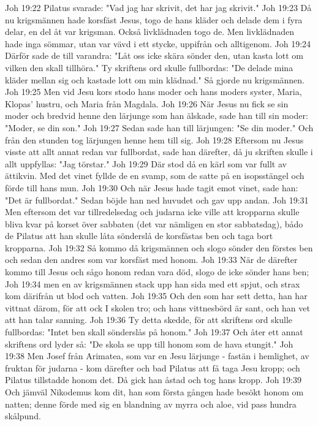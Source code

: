 Joh 19:22  Pilatus svarade: "Vad jag har skrivit, det har jag skrivit."
Joh 19:23  Då nu krigsmännen hade korsfäst Jesus, togo de hans kläder och delade dem i fyra delar, en del åt var krigsman. Också livklädnaden togo de. Men livklädnaden hade inga sömmar, utan var vävd i ett stycke, uppifrån och alltigenom.
Joh 19:24  Därför sade de till varandra: "Låt oss icke skära sönder den, utan kasta lott om vilken den skall tillhöra." Ty skriftens ord skulle fullbordas: "De delade mina kläder mellan sig och kastade lott om min klädnad." Så gjorde nu krigsmännen.
Joh 19:25  Men vid Jesu kors stodo hans moder och hans moders syster, Maria, Klopas' hustru, och Maria från Magdala.
Joh 19:26  När Jesus nu fick se sin moder och bredvid henne den lärjunge som han älskade, sade han till sin moder: "Moder, se din son."
Joh 19:27  Sedan sade han till lärjungen: "Se din moder." Och från den stunden tog lärjungen henne hem till sig.
Joh 19:28  Eftersom nu Jesus visste att allt annat redan var fullbordat, sade han därefter, då ju skriften skulle i allt uppfyllas: "Jag törstar."
Joh 19:29  Där stod då en kärl som var fullt av ättikvin. Med det vinet fyllde de en svamp, som de satte på en isopsstängel och förde till hans mun.
Joh 19:30  Och när Jesus hade tagit emot vinet, sade han: "Det är fullbordat." Sedan böjde han ned huvudet och gav upp andan.
Joh 19:31  Men eftersom det var tillredelsedag och judarna icke ville att kropparna skulle bliva kvar på korset över sabbaten (det var nämligen en stor sabbatsdag), bådo de Pilatus att han skulle låta sönderslå de korsfästas ben och taga bort kropparna.
Joh 19:32  Så kommo då krigsmännen och slogo sönder den förstes ben och sedan den andres som var korsfäst med honom.
Joh 19:33  När de därefter kommo till Jesus och sågo honom redan vara död, slogo de icke sönder hans ben;
Joh 19:34  men en av krigsmännen stack upp han sida med ett spjut, och strax kom därifrån ut blod och vatten.
Joh 19:35  Och den som har sett detta, han har vittnat därom, för att ock I skolen tro; och hans vittnesbörd är sant, och han vet att han talar sanning.
Joh 19:36  Ty detta skedde, för att skriftens ord skulle fullbordas: "Intet ben skall sönderslås på honom."
Joh 19:37  Och åter ett annat skriftens ord lyder så: "De skola se upp till honom som de hava stungit."
Joh 19:38  Men Josef från Arimatea, som var en Jesu lärjunge - fastän i hemlighet, av fruktan för judarna - kom därefter och bad Pilatus att få taga Jesu kropp; och Pilatus tillstadde honom det. Då gick han åstad och tog hans kropp.
Joh 19:39  Och jämväl Nikodemus kom dit, han som första gången hade besökt honom om natten; denne förde med sig en blandning av myrra och aloe, vid pass hundra skålpund.
